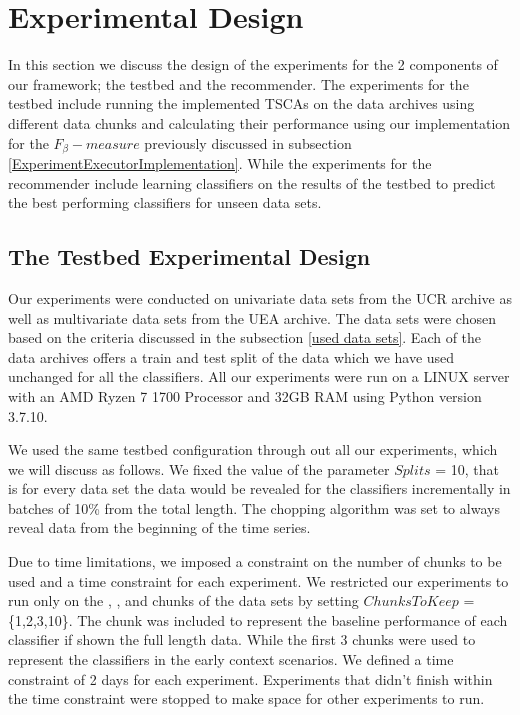 \section{Experimental Design}
\label{SectionExperiment}
In this section we discuss the design of the experiments for the 2 components of our framework; the testbed and the recommender.
The experiments for the testbed include running the implemented TSCAs on the data archives using different data chunks and calculating their performance using
our implementation for the $F_{\beta}-measure$ previously discussed in subsection \ref{ExperimentExecutorImplementation}.
While the experiments for the recommender include learning classifiers on the results of the testbed to predict the best performing
classifiers for unseen data sets.

\subsection{The Testbed Experimental Design}
\label{SubsectionTestbedExperiment}
Our experiments were conducted on univariate data sets from the UCR archive as well as multivariate data sets from the UEA archive.
The data sets were chosen based on the criteria discussed in the subsection \ref{used data sets}.
Each of the data archives offers a train and test split of the data which we have used unchanged for all the classifiers.
All our experiments were run on a LINUX server with an AMD Ryzen 7 1700 Processor and 32GB RAM using Python version 3.7.10.

We used the same testbed configuration through out all our experiments, which we will discuss as follows.
We fixed the value of the parameter $Splits$ = 10, that is for every data set the data would be revealed for the classifiers incrementally in batches of 10\% from the total length.
The chopping algorithm was set to always reveal data from the beginning of the time series.

Due to time limitations, we imposed a constraint on the number of chunks to be used and a time constraint for each experiment.
We restricted our experiments to run only on the , ,  and  chunks of the data sets by setting $ChunksToKeep$ = \{1,2,3,10\}.
The  chunk was included to represent the baseline performance of each classifier if shown the full length data.
While the first 3 chunks were used to represent the classifiers in the early context scenarios.
We defined a time constraint of 2 days for each experiment.
Experiments that didn't finish within the time constraint were stopped to make space for other experiments to run.


